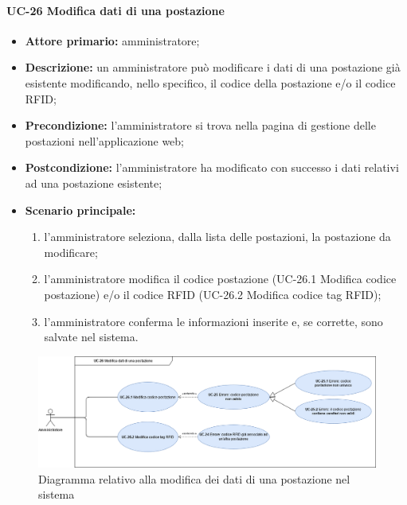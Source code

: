 \paragraph{UC-26 Modifica dati di una postazione}
\begin{itemize}
    \item \textbf{Attore primario:} amministratore;
    \item \textbf{Descrizione:} un amministratore pu\`{o} modificare i dati di una postazione già esistente modificando, nello specifico, il codice della postazione e/o il codice RFID;
    \item \textbf{Precondizione:} l'amministratore si trova nella pagina di gestione delle postazioni nell'applicazione web;
    \item \textbf{Postcondizione:} l'amministratore ha modificato con successo i dati relativi ad una postazione esistente;
    \item \textbf{Scenario principale:}
    \begin{enumerate}
        \item l'amministratore seleziona, dalla lista delle postazioni, la postazione da modificare;
        \item l'amministratore modifica il codice postazione (UC-26.1 Modifica codice postazione) e/o il codice RFID (UC-26.2 Modifica codice tag RFID);
        \item l'amministratore conferma le informazioni inserite e, se corrette, sono salvate nel sistema.
    \end{enumerate}
\end{itemize}

\begin{figure}[H]
    \centering
      \includegraphics[scale=0.35]{src/CasiDUso/immagini/ModificaPostazione.png}
    \caption{Diagramma relativo alla modifica dei dati di una postazione nel sistema}
\end{figure}


